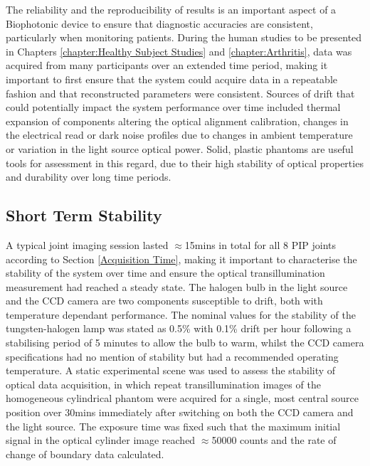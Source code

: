 \documentclass[twoside]{bhamthesis}
\theoremstyle{definition}
\begin{document}
The reliability and the reproducibility of results is an important aspect of a Biophotonic device to ensure that diagnostic accuracies are consistent, particularly when monitoring patients. During the human studies to be presented in Chapters \ref{chapter:Healthy Subject Studies} and \ref{chapter:Arthritis}, data was acquired from many participants over an extended time period, making it important to first ensure that the system could acquire data in a repeatable fashion and that reconstructed parameters were consistent. Sources of drift that could potentially impact the system performance over time included thermal expansion of components altering the optical alignment calibration, changes in the electrical read or dark noise profiles due to changes in ambient temperature or variation in the light source optical power. Solid, plastic phantoms are useful tools for assessment in this regard, due to their high stability of optical properties and durability over long time periods. 

\subsection{Short Term Stability}

\label{appendix:stability}
A typical joint imaging session lasted $\approx$15mins in total for all 8 PIP joints according to Section \ref{Acquisition Time}, making it important to characterise the stability of the system over time and ensure the optical transillumination measurement had reached a steady state. The halogen bulb in the light source and the CCD camera are two components susceptible to drift, both with temperature dependant performance. The nominal values for the stability of the tungsten-halogen lamp was stated as 0.5\% with 0.1\% drift per hour following a stabilising period of 5 minutes to allow the bulb to warm, whilst the CCD camera specifications had no mention of stability but had a recommended operating temperature. A static experimental scene was used to assess the stability of optical data acquisition, in which repeat transillumination images of the homogeneous cylindrical phantom were acquired for a single, most central source position over 30mins immediately after switching on both the CCD camera and the light source. The exposure time was fixed such that the maximum initial signal in the optical cylinder image reached $\approx$50000 counts and the rate of change of boundary data calculated.

\begin{comment}
\begin{figure}[!ht]
\centering
  \centering
  \texttt{[image: temporal\_stability2]}
\caption{a) Mean intensity and b) standard deviation for transillumination images of cylindrical phantom over time for 730nm. A corresponding plot of the camera temperature is also shown. the running average across a 65.2s window is also shown, following an initial stabilisation period is.}
  \label{fig:Temporal_stability2}
\end{figure}
\end{comment}
\end{document}
